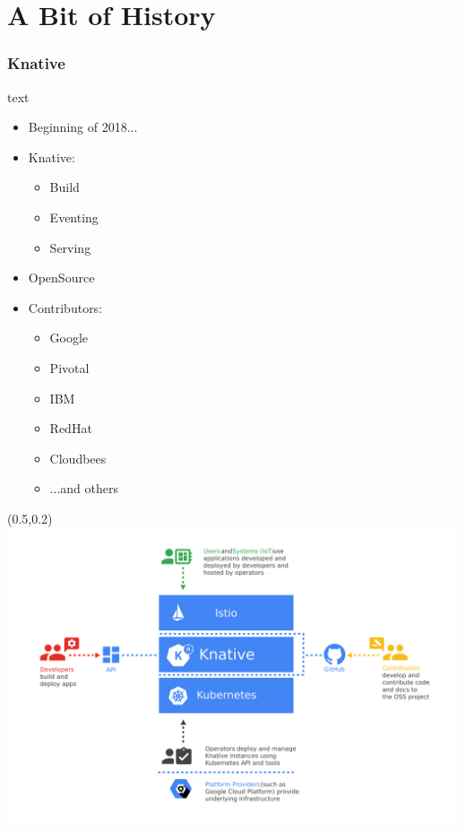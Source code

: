 \documentclass[aspectratio=169,11pt,hyperref={colorlinks=true}]{beamer}
\begin{document}



\section{A Bit of History}

\begin{lblackrwhiteframe}
  \frametitle{Knative}
  \large
  \begin{beamercolorbox}[wd=0.3\paperwidth]{text}
    \begin{itemize}
      \item Beginning of 2018...
      \item Knative:
      \begin{itemize}
        \item Build
        \item Eventing
        \item Serving
      \end{itemize}
    \end{itemize}
    \begin{itemize}
      \item OpenSource
      \item Contributors:
      \begin{itemize}
        \item Google
        \item Pivotal
        \item IBM
        \item RedHat
        \item Cloudbees
        \item ...and others
      \end{itemize}
    \end{itemize}
  \end{beamercolorbox}%
  \begin{textblock*}{0.5\paperwidth}(0.5\paperwidth,0.2\paperheight)
    \centering
    \includegraphics[width=0.45\paperwidth]{img/knative-audience.png}

\end{textblock*}
\end{lblackrwhiteframe}
\end{document}
